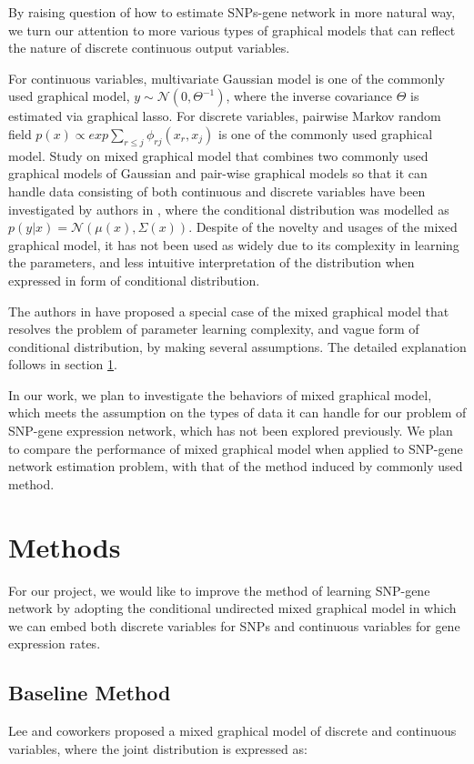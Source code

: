 \documentclass{article}
\begin{document}
By raising question of how to estimate SNPs-gene network in more natural way, we turn our attention to more various types of graphical models that can reflect the nature of discrete continuous output variables. 

For continuous variables, multivariate Gaussian model is one of the commonly used graphical model, $y \sim \mathcal{N}(0, \Theta^{-1})$, where the inverse covariance $\Theta$ is estimated via graphical lasso. For discrete variables, pairwise Markov random field $p(x) \propto exp \sum_{r\leq j} \phi_{rj}(x_r, x_j)$ is one of the commonly used graphical model.
Study on mixed graphical model that combines two commonly used graphical models of Gaussian and pair-wise graphical models so that it can handle data consisting of both continuous and discrete variables have been investigated by authors in \cite{lauritzen1989graphical}, where the conditional distribution was modelled as $p(y|x) = \mathcal{N}(\mu(x), \Sigma(x))$. 
Despite of the novelty and usages of the mixed graphical model, it has not been used as widely due to its complexity in learning the parameters, and less intuitive interpretation of the distribution when expressed in form of conditional distribution.

The authors in \cite{lee2013structure} have proposed a special case of the mixed graphical model that resolves the problem of parameter learning complexity, and vague form of conditional distribution, by making several assumptions.
 The detailed explanation follows in section \ref{Methods}.
 
In our work, we plan to investigate the behaviors of mixed graphical model, which meets the assumption on the types of data it can handle for our problem of SNP-gene expression network, which has not been explored previously. We plan to compare the performance of mixed graphical model when applied to SNP-gene network estimation problem, with that of the method induced by commonly used method.




\section{Methods}
\label{Methods}
For our project, we would like to improve the method of learning SNP-gene network by adopting the conditional undirected mixed graphical model in which we can embed both discrete variables for SNPs and continuous variables for gene expression rates.

\subsection{Baseline Method}
Lee and coworkers \cite{lee2013structure} proposed a mixed graphical model of discrete and continuous variables, where the joint distribution is expressed as:
\end{document}
